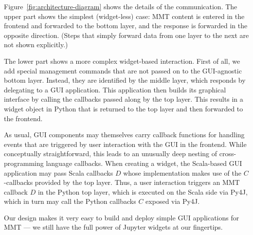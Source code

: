 Figure~\ref{fig:architecture-diagram} shows the details of the communication.
The upper part shows the simplest (widget-less) case: MMT content is entered in the frontend and forwarded to the bottom layer, and the response is forwarded in the opposite direction. (Steps that simply forward data from one layer to the next are not shown explicitly.)

The lower part shows a more complex widget-based interaction.
First of all, we add special management commands that are not passed on to the GUI-agnostic bottom layer.
Instead, they are identified by the middle layer, which responds by delegating to a GUI application.
This application then builds its graphical interface by calling the callbacks passed along by the top layer.
This results in a widget object in Python that is returned to the top layer and then forwarded to the frontend.

As usual, GUI components may themselves carry callback functions for handling events that are triggered by user interaction with the GUI in the frontend.
While conceptually straightforward, this leads to an unusually deep nesting of cross-programming language callbacks.
When creating a widget, the Scala-based GUI application may pass Scala callbacks $D$ whose implementation makes use of the $C$-callbacks provided by the top layer.
Thus, a user interaction triggers an MMT callback $D$ in the Python top layer, which is executed on the Scala side via Py4J, which in turn may call the Python callbacks $C$ exposed via Py4J.

Our design makes it very easy to build and deploy simple GUI applications for MMT --- we still have the full power of Jupyter widgets at our fingertips.

